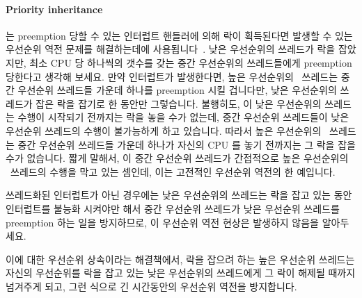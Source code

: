 \paragraph{Priority inheritance} 는 preemption 당할 수 있는 인터럽트 핸들러에
의해 락이 획득된다면 발생할 수 있는 우선순위 역전 문제를 해결하는데에
사용됩니다~\cite{LuiSha1990PriorityInheritance}.
낮은 우선순위의 쓰레드가 락을 잡았지만, 최소 CPU 당 하나씩의 갯수를 갖는 중간
우선순위의 쓰레드들에게 preemption 당한다고 생각해 보세요.
만약 인터럽트가 발생한다면, 높은 우선순위의 \IRQ\ 쓰레드는 중간 우선순위
쓰레드들 가운데 하나를 preemption 시킬 겁니다만, 낮은 우선순위의 쓰레드가 잡은
락을 잡기로 한 동안만 그렇습니다.
불행히도, 이 낮은 우선순위의 쓰레드는 수행이 시작되기 전까지는 락을 놓을 수가
없는데, 중간 우선순위 쓰레드들이 낮은 우선순위 쓰레드의 수행이 불가능하게 하고
있습니다.
따라서 높은 우선순위의 \IRQ\ 쓰레드는 중간 우선순위 쓰레드들 가운데 하나가
자신의 CPU 를 놓기 전까지는 그 락을 잡을 수가 없습니다.
짧게 말해서, 이 중간 우선순위 쓰레드가 간접적으로 높은 우선순위의 \IRQ\
쓰레드의 수행을 막고 있는 셈인데, 이는 고전적인 우선순위 역전의 한 예입니다.

쓰레드화된 인터럽트가 아닌 경우에는 낮은 우선순위의 쓰레드는 락을 잡고 있는
동안 인터럽트를 불능화 시켜야만 해서 중간 우선순위 쓰레드가 낮은 우선순위
쓰레드를 preemption 하는 일을 방지하므로, 이 우선순위 역전 현상은 발생하지
않음을 알아두세요.

이에 대한 우선순위 상속이라는 해결책에서, 락을 잡으려 하는 높은 우선순위
쓰레드는 자신의 우선순위를 락을 잡고 있는 낮은 우선순위의 쓰레드에게 그 락이
해제될 때까지 넘겨주게 되고, 그런 식으로 긴 시간동안의 우선순위 역전을
방지합니다.
\iffalse


